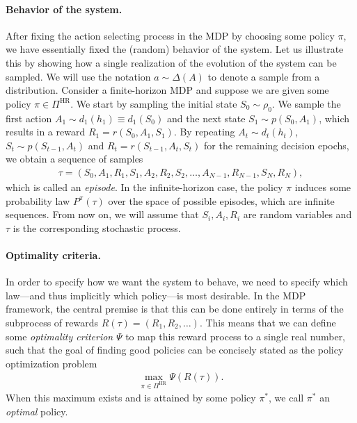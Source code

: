 \documentclass[11pt,a4paper]{article}
\theoremstyle{remark}
\begin{document}
\paragraph{Behavior of the system.}
After fixing the action selecting process in the MDP by choosing some policy
$\pi$, we have essentially fixed the (random) behavior of the system.
%
Let us illustrate this by showing how a single realization of the evolution of
the system can be sampled. We will use the notation $a \sim \Delta(A)$ to denote
a sample from a distribution.
%
Consider a finite-horizon MDP and suppose we are given some policy
$\pi \in \Pi^\mathrm{HR}$.
%
We start by sampling the initial state $S_0 \sim \rho_0$. We sample the first
action $A_1 \sim d_1(h_1) \equiv d_1(S_0)$ and the next state
$S_1 \sim p(S_0, A_1)$, which results in a reward $R_1 = r(S_0, A_1, S_1)$. By
repeating $A_t \sim d_t(h_t)$, $S_t \sim p(S_{t-1}, A_t)$ and
$R_t = r(S_{t-1}, A_t, S_t)$ for the remaining decision epochs, we obtain a
sequence of samples
\begin{align}
  \tau = (S_0, A_1, R_1, S_1, A_2, R_2, S_2, \dots, A_{N-1}, R_{N-1}, S_N, R_N) ,
\end{align}
which is called an \emph{episode}.
%
In the infinite-horizon case, the policy $\pi$ induces some probability law
$P^\pi(\tau)$ over the space of possible episodes, which are infinite sequences.
%
From now on, we will assume that $S_i, A_i, R_i$ are random variables and $\tau$
is the corresponding stochastic process.

\paragraph{Optimality criteria.}
In order to specify how we want the system to behave, we need to specify which
law---and thus implicitly which policy---is most desirable.
%
In the MDP framework, the central premise is that this can be done entirely in
terms of the subprocess of rewards $R(\tau) = (R_1, R_2, \dots)$.
%
This means that we can define some \emph{optimality criterion} $\Psi$ to map this reward
process to a single real number, such that the goal of finding good policies can
be concisely stated as the policy optimization problem
\begin{align}
  \max_{\pi \in \Pi^\mathrm{HR}} \Psi\left(R(\tau)\right) .
\end{align}
When this maximum exists and is attained by some policy $\pi^*$, we call $\pi^*$
an \emph{optimal} policy.
\end{document}
